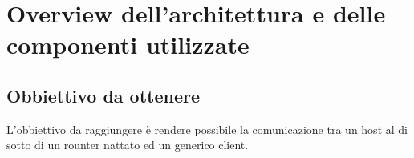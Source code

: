

\chapter{Overview dell'architettura e delle componenti utilizzate}
\setlength{\parskip}{1em}
\setlength{\parindent}{0em}
\renewcommand{\baselinestretch}{1.15}

\label{ch:1}

\section{Obbiettivo da ottenere}

L'obbiettivo da raggiungere \`e rendere possibile la comunicazione tra un host al di sotto di un rounter nattato ed un generico client. 


